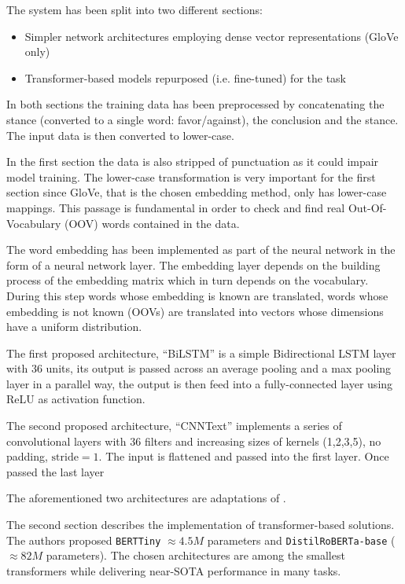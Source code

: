 \documentclass[11pt]{article}
\begin{document}
The system has been split into two different sections:
\begin{itemize}
\item Simpler network architectures employing dense vector representations (GloVe only)
\item Transformer-based models repurposed (i.e. fine-tuned) for the task
\end{itemize}

In both sections the training data has been preprocessed by concatenating the stance (converted to a single word: favor/against), the conclusion and the stance. The input data is then converted to lower-case.

In the first section the data is also stripped of punctuation as it could impair model training. The lower-case transformation is very important for the first section since GloVe, that is the chosen embedding method, only has lower-case mappings. This passage is fundamental in order to check and find real Out-Of-Vocabulary (OOV) words contained in the data.

The word embedding has been implemented as part of the neural network in the form of a neural network layer. The embedding layer depends on the building process of the embedding matrix which in turn depends on the vocabulary. During this step words whose embedding is known are translated, words whose embedding is not known (OOVs) are translated into vectors whose dimensions have a uniform distribution.

The first proposed architecture, ``BiLSTM'' is a simple Bidirectional LSTM layer with $36$ units, its output is passed across an average pooling and a max pooling layer in a parallel way, the output is then feed into a fully-connected layer using ReLU as activation function.

The second proposed architecture, ``CNNText'' implements a series of convolutional layers with $36$ filters and increasing sizes of kernels (1,2,3,5), no padding, $\text{stride}=1$. The input is flattened and passed into the first layer. Once passed the last layer

The aforementioned two architectures are adaptations of \cite{Agarwal2020}.

The second section describes the implementation of transformer-based solutions. The authors proposed  \texttt{BERTTiny}\cite{Bhargava2021, Turc2019} $\approx 4.5M$ parameters and \texttt{DistilRoBERTa-base}\cite{Sanh2019} ($\approx 82M$ parameters). The chosen architectures are among the smallest transformers while delivering near-SOTA performance in many tasks.
\end{document}
